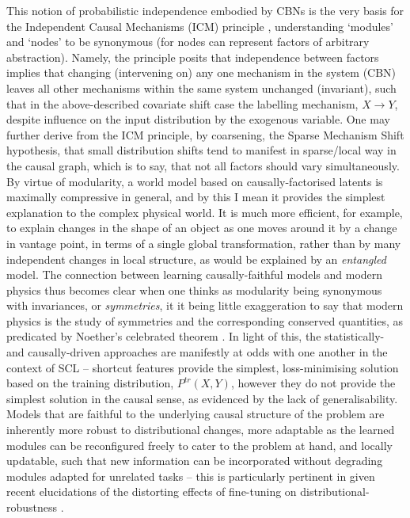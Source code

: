 %
This notion of probabilistic independence embodied by \acp{CBN} is the very basis for the Independent
Causal Mechanisms (ICM) principle \citep{scholkopf2021toward}, understanding `modules' and `nodes'
to be synonymous (for nodes can represent factors of arbitrary abstraction).
%
Namely, the principle posits that independence between factors implies that changing (intervening
on) any one mechanism in the system (CBN) leaves all other mechanisms within the same system
unchanged (invariant), such that in the above-described covariate shift case the labelling
mechanism, \(X \to Y\), despite influence on the input distribution by the exogenous variable.
%
%
One may further derive from the ICM principle, by coarsening, the Sparse Mechanism Shift
hypothesis, that small distribution shifts tend to manifest in sparse/local way in the causal
graph, which is to say, that not all factors should vary simultaneously.
%
By virtue of modularity, a world model based on causally-factorised latents is maximally
compressive in general, and by this I mean it provides the simplest explanation to the complex
physical world.
%
It is much more efficient, for example, to explain changes in the shape of an object as one moves
around it by a change in vantage point, in terms of a single global transformation, rather than by
many independent changes in local structure, as would be explained by an \emph{entangled} model.
%
The connection between learning causally-faithful models and modern physics thus becomes clear when
one thinks as modularity being synonymous with invariances, or \emph{symmetries}, it it being
little exaggeration to say that modern physics is the study of symmetries and the corresponding
conserved quantities, as predicated by Noether's celebrated theorem \citep{noether1918invariante}.
%
In light of this, the statistically- and causally-driven approaches are manifestly at odds with one
another in the context of \ac{SCL} -- shortcut features provide the simplest, loss-minimising
solution based on the training distribution, \(P^{tr}(X, Y)\), however they do not provide the
simplest solution in the causal sense, as evidenced by the lack of generalisability.
%
Models that are faithful to the underlying causal structure of the problem are inherently more
robust to distributional changes, more adaptable as the learned modules can be reconfigured freely
to cater to the problem at hand, and locally updatable, such that  new information can be
incorporated without degrading modules adapted for unrelated tasks -- this is particularly
pertinent in given recent elucidations of the distorting effects of fine-tuning on
distributional-robustness \citep{andreassen2021evolution, kumar2022finetuning}.

